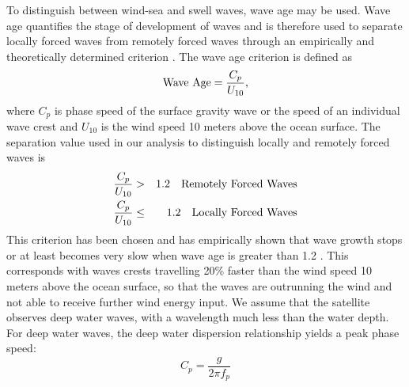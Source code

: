 \documentclass[12pt,twoside]{article}
\begin{document}

To distinguish between wind-sea and swell waves, wave age may be used. Wave age quantifies the stage of development of waves and is therefore used to separate locally forced waves from remotely forced waves through an empirically and theoretically determined criterion \cite{alves2003revisiting}. The wave age criterion is defined as 
\begin{equation}
     \mbox{\rm Wave Age} = \frac{C_{p}}{U_{10}},
 \end{equation}
where $C_{p}$ is phase speed of the surface gravity wave or the speed of an individual wave crest and $U_{10}$ is the wind speed 10 meters above the ocean surface. The separation value used in our analysis to distinguish locally and remotely forced waves is 
\begin{eqnarray}
     \frac{C_{p}}{U_{10}} & > & 1.2\quad {\mbox{\rm Remotely Forced Waves}} \\
     \frac{C_{p}}{U_{10}} & \leq & 1.2\quad {\mbox{\rm Locally Forced Waves}}
\end{eqnarray}
This criterion has been chosen and has empirically shown that wave growth stops or at least becomes very slow when wave age is greater than 1.2 \cite{donelan1992growth}. This corresponds with waves crests travelling 20\% faster than the wind speed 10 meters above the ocean surface, so that the waves are outrunning the wind and not able to receive further wind energy input. We assume that the satellite observes deep water waves, with a wavelength much less than the water depth. For deep water waves, the deep water dispersion relationship yields a peak phase speed: 
\begin{equation}
    C_{p} = \frac{g}{2\pi f_{p}}
\end{equation}

\end{document}
